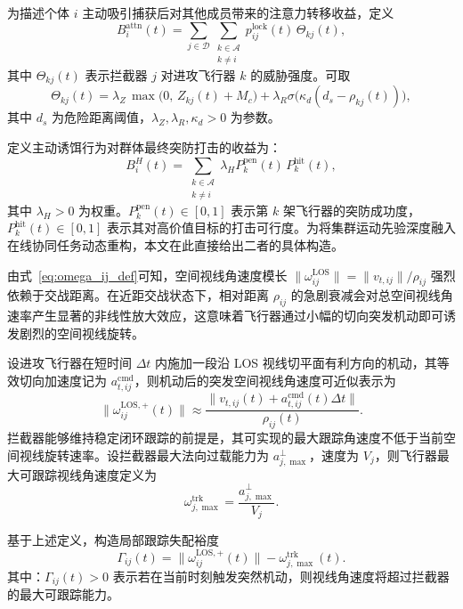 为描述个体 $i$ 主动吸引捕获后对其他成员带来的注意力转移收益，定义
\begin{equation}
B_i^{\mathrm{attn}}(t)
=
\sum_{j\in\mathcal{D}}
\sum_{\substack{k\in\mathcal{A}\\k\neq i}}
p_{ij}^{\mathrm{lock}}(t)\,\Theta_{kj}(t),
\end{equation}
其中 $\Theta_{kj}(t)$ 表示拦截器 $j$ 对进攻飞行器 $k$ 的威胁强度。可取
\begin{equation}
\Theta_{kj}(t)
=
\lambda_Z\,\max\bigl(0,\, Z_{kj}(t)+M_c\bigr)
+
\lambda_R \sigma\!\bigl(\kappa_d(d_s-\rho_{kj}(t))\bigr),
\end{equation}
其中 $d_s$ 为危险距离阈值，$\lambda_Z,\lambda_R,\kappa_d>0$ 为参数。

定义主动诱饵行为对群体最终突防打击的收益为：
\begin{equation}
B_i^{H}(t)
=
\sum_{\substack{k\in\mathcal{A}\\k\neq i}}
\lambda_H P_k^{\mathrm{pen}}(t)\,P_k^{\mathrm{hit}}(t),
\end{equation}
其中 $\lambda_H>0$ 为权重。$P_k^{\mathrm{pen}}(t)\in[0,1]$ 表示第 $k$ 架飞行器的突防成功度，$P_k^{\mathrm{hit}}(t)\in[0,1]$ 表示其对高价值目标的打击可行度。为将集群运动先验深度融入在线协同任务动态重构，本文在此直接给出二者的具体构造。

由式~\eqref{eq:omega_ij_def}可知，空间视线角速度模长 $\|\omega_{ij}^{\mathrm{LOS}}\| = \|v_{t,ij}\|/\rho_{ij}$ 强烈依赖于交战距离。在近距交战状态下，相对距离 $\rho_{ij}$ 的急剧衰减会对总空间视线角速率产生显著的非线性放大效应，这意味着飞行器通过小幅的切向突发机动即可诱发剧烈的空间视线旋转。

设进攻飞行器在短时间 $\Delta t$ 内施加一段沿 LOS 视线切平面有利方向的机动，其等效切向加速度记为 $a_{t,ij}^{\mathrm{cmd}}$，则机动后的突发空间视线角速度可近似表示为
\begin{equation}
\|\omega_{ij}^{\mathrm{LOS},+}(t)\|
\approx
\frac{\|v_{t,ij}(t)+a_{t,ij}^{\mathrm{cmd}}(t)\Delta t\|}{\rho_{ij}(t)}.
\end{equation}
拦截器能够维持稳定闭环跟踪的前提是，其可实现的最大跟踪角速度不低于当前空间视线旋转速率。设拦截器最大法向过载能力为 $a_{j,\max}^{\perp}$，速度为 $V_j$，则飞行器最大可跟踪视线角速度定义为
\begin{equation}
\omega_{j,\max}^{\mathrm{trk}}
=
\frac{a_{j,\max}^{\perp}}{V_j}.
\end{equation}

基于上述定义，构造局部跟踪失配裕度
\begin{equation}
\Gamma_{ij}(t)
=
\|\omega_{ij}^{\mathrm{LOS},+}(t)\|
-
\omega_{j,\max}^{\mathrm{trk}}(t).
\end{equation}
其中：$\Gamma_{ij}(t)>0$ 表示若在当前时刻触发突然机动，则视线角速度将超过拦截器的最大可跟踪能力。

